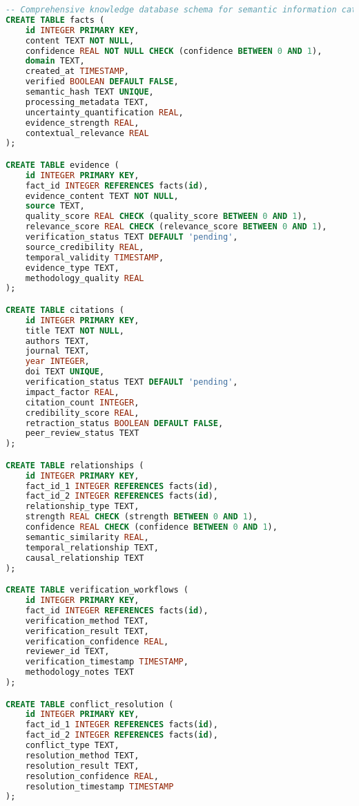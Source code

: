 \documentclass[12pt,a4paper,twoside]{article}
\begin{document}
\begin{lstlisting}[language=sql,caption=Comprehensive Knowledge Database Schema]
-- Comprehensive knowledge database schema for semantic information catalysis
CREATE TABLE facts (
    id INTEGER PRIMARY KEY,
    content TEXT NOT NULL,
    confidence REAL NOT NULL CHECK (confidence BETWEEN 0 AND 1),
    domain TEXT,
    created_at TIMESTAMP,
    verified BOOLEAN DEFAULT FALSE,
    semantic_hash TEXT UNIQUE,
    processing_metadata TEXT,
    uncertainty_quantification REAL,
    evidence_strength REAL,
    contextual_relevance REAL
);

CREATE TABLE evidence (
    id INTEGER PRIMARY KEY,
    fact_id INTEGER REFERENCES facts(id),
    evidence_content TEXT NOT NULL,
    source TEXT,
    quality_score REAL CHECK (quality_score BETWEEN 0 AND 1),
    relevance_score REAL CHECK (relevance_score BETWEEN 0 AND 1),
    verification_status TEXT DEFAULT 'pending',
    source_credibility REAL,
    temporal_validity TIMESTAMP,
    evidence_type TEXT,
    methodology_quality REAL
);

CREATE TABLE citations (
    id INTEGER PRIMARY KEY,
    title TEXT NOT NULL,
    authors TEXT,
    journal TEXT,
    year INTEGER,
    doi TEXT UNIQUE,
    verification_status TEXT DEFAULT 'pending',
    impact_factor REAL,
    citation_count INTEGER,
    credibility_score REAL,
    retraction_status BOOLEAN DEFAULT FALSE,
    peer_review_status TEXT
);

CREATE TABLE relationships (
    id INTEGER PRIMARY KEY,
    fact_id_1 INTEGER REFERENCES facts(id),
    fact_id_2 INTEGER REFERENCES facts(id),
    relationship_type TEXT,
    strength REAL CHECK (strength BETWEEN 0 AND 1),
    confidence REAL CHECK (confidence BETWEEN 0 AND 1),
    semantic_similarity REAL,
    temporal_relationship TEXT,
    causal_relationship TEXT
);

CREATE TABLE verification_workflows (
    id INTEGER PRIMARY KEY,
    fact_id INTEGER REFERENCES facts(id),
    verification_method TEXT,
    verification_result TEXT,
    verification_confidence REAL,
    reviewer_id TEXT,
    verification_timestamp TIMESTAMP,
    methodology_notes TEXT
);

CREATE TABLE conflict_resolution (
    id INTEGER PRIMARY KEY,
    fact_id_1 INTEGER REFERENCES facts(id),
    fact_id_2 INTEGER REFERENCES facts(id),
    conflict_type TEXT,
    resolution_method TEXT,
    resolution_result TEXT,
    resolution_confidence REAL,
    resolution_timestamp TIMESTAMP
);
\end{lstlisting}
\end{document}
